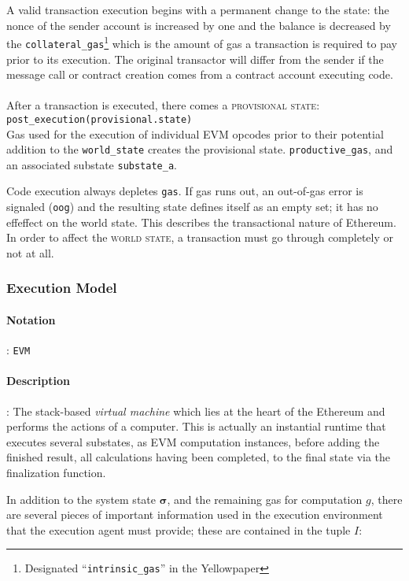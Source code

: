 \documentclass[10pt,a4paper,leqno,bibliography=totoc]{scrartcl}
\newenvironment{alphafootnotes}
{\par\edef\savedfootnotenumber{\number\value{footnote}}
\renewcommand{\thefootnote}{\alph{footnote}}
\setcounter{footnote}{0}}
{\par\setcounter{footnote}{\savedfootnotenumber}}
\begin{document}
\begin{alphafootnotes}
\begin{multicols*}{2}
																			A valid transaction execution begins with a permanent change to the state: the nonce of the sender account is increased by one and the balance is decreased by the \texttt{collateral\_gas}\footnote{Designated ``\texttt{intrinsic\_gas}'' in the Yellowpaper} which is the amount of gas a transaction is required to pay prior to its execution. The original transactor will differ from the sender if the message call or contract creation comes from a contract account executing code. 
\paragraph{}After a transaction is executed, there comes a \textsc{provisional state}:
			\\
			\texttt{post\_execution(provisional.state)}
			\\
			Gas used for the execution of individual EVM opcodes prior to their potential addition to the \texttt{world\_state} creates the provisional state. \texttt{productive\_gas}, and an associated substate \texttt{substate\_a}. 
\par
																			Code execution always depletes \texttt{gas}. If gas runs out, an out-of-gas error is signaled (\texttt{oog}) and the resulting state defines itself as an empty set; it has no effeffect on the world state. This describes the transactional nature of Ethereum. In order to affect the \textsc{world state}, a transaction must go through completely or not at all. 


	
			\subsubsection{Execution Model}
				\paragraph{Notation}: \texttt{EVM}
				\paragraph{Description}: The stack-based \textsl{virtual machine} which lies at the heart of the Ethereum and performs the actions of a computer. This is actually an instantial runtime that executes several substates, as EVM computation instances, before adding the finished result, all calculations having been completed, to the final state  via the finalization function.  
	
				In addition to the system state $\boldsymbol{\sigma}$, and the remaining gas for computation $g$, there are several pieces of important information used in the execution environment that the execution agent must provide; these are contained in the tuple $I$:


\end{multicols*}
\end{alphafootnotes}
\end{document}
